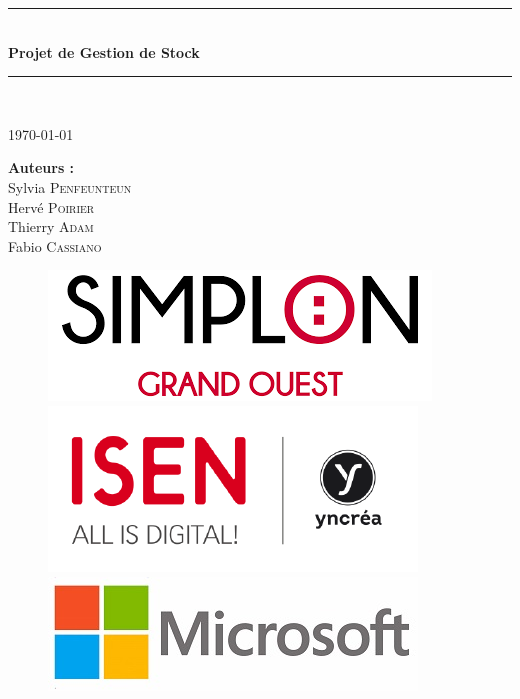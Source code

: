 \documentclass[french]{article}
\begin{document}
\begin{titlepage}

\newcommand{\HRule}{\rule{\linewidth}{0.5mm}} %

\center %
 
\HRule \\[0.4cm]
\vspace{1cm}
{ \huge \bfseries Projet de Gestion de Stock}\\ %
\vspace{1cm}
\HRule \\[1cm]
 
\vspace{1cm}

\Large \today

\vspace{3cm}

\begin{minipage}{0.4\textwidth}
\begin{center}
\Large \textbf{Auteurs :}\\
\vspace{0.5cm}
Sylvia \textsc{Penfeunteun} \\
Hervé \textsc{Poirier}\\
Thierry \textsc{Adam}\\
Fabio \textsc{Cassiano}
\end{center}
\end{minipage}

\vspace{5cm}

\begin{figure}[!ht]
	\includegraphics[height=0.1\columnwidth]{Image/logo/logo_simplon.png}
	\hspace*{0.5cm}
	\includegraphics[height=0.12\columnwidth]{Image/logo/logo_Isen.png}
	\hspace*{0.5cm}
	\includegraphics[height=0.1\columnwidth]{Image/logo/logo_microsoft.jpg}
\end{figure}


\end{titlepage}
\end{document}
